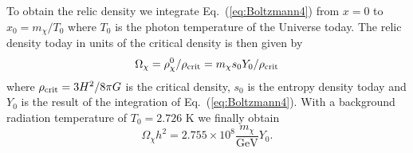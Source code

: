 
To obtain the relic density we integrate Eq.~(\ref{eq:Boltzmann4})
from $x=0$ to $x_0=m_\chi/T_0$ where $T_0$ is the photon temperature
of the Universe today. The relic density today in units of the
critical density is then given by
\begin{equation}
  \Omega_\chi = \rho_\chi^0/\rho_{\rm
  crit}=m_\chi s_0 Y_0/\rho_{\rm crit}
\end{equation}
where $\rho_{\rm crit}=3 H^2/8 \pi G$ is the critical density, $s_{0}$ 
is the entropy density today and $Y_{0}$ is the result of the 
integration of Eq.~(\ref{eq:Boltzmann4}). With a
background radiation temperature of $T_0=2.726$ K we finally obtain
\begin{equation} \label{eq:omegah2}
  \Omega_\chi h^2 = 2.755\times 10^8 \frac{m_\chi}{\mbox{GeV}} Y_0.
\end{equation}

